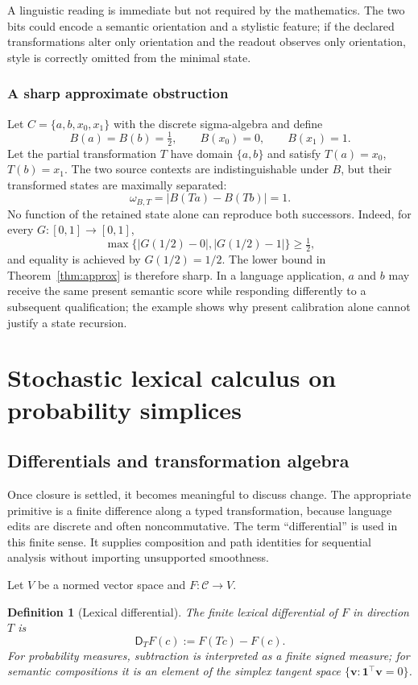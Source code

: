 \documentclass[11pt]{article}
\newtheorem{definition}{Definition}[section]
\newcommand{\Ctxt}{\mathcal C}
\newcommand{\Dlex}{\mathsf D}
\begin{document}
A linguistic reading is immediate but not required by the mathematics. The two bits could encode a semantic orientation and a stylistic feature; if the declared transformations alter only orientation and the readout observes only orientation, style is correctly omitted from the minimal state.

\subsubsection{A sharp approximate obstruction}
Let $C=\{a,b,x_0,x_1\}$ with the discrete sigma-algebra and define
\[
B(a)=B(b)=\tfrac12,\qquad B(x_0)=0,\qquad B(x_1)=1.
\]
Let the partial transformation $T$ have domain $\{a,b\}$ and satisfy $T(a)=x_0$, $T(b)=x_1$. The two source contexts are indistinguishable under $B$, but their transformed states are maximally separated:
\[
\omega_{B,T}=|B(Ta)-B(Tb)|=1.
\]
No function of the retained state alone can reproduce both successors. Indeed, for every $G:[0,1]\to[0,1]$,
\[
\max\{|G(1/2)-0|,|G(1/2)-1|\}\ge\tfrac12,
\]
and equality is achieved by $G(1/2)=1/2$. The lower bound in
Theorem~\ref{thm:approx} is therefore sharp. In a language application, $a$
and $b$ may receive the same present semantic score while responding
differently to a subsequent qualification; the example shows why present
calibration alone cannot justify a state recursion.

\section{Stochastic lexical calculus on probability simplices}

\subsection{Differentials and transformation algebra}

Once closure is settled, it becomes meaningful to discuss change.  The
appropriate primitive is a finite difference along a typed transformation,
because language edits are discrete and often noncommutative.  The term
``differential'' is used in this finite sense.  It supplies composition and
path identities for sequential analysis without importing unsupported
smoothness.

Let $V$ be a normed vector space and $F:\Ctxt\to V$.

\begin{definition}[Lexical differential]
The finite lexical differential of $F$ in direction $T$ is
\[
 \Dlex_TF(c):=F(Tc)-F(c).
\]
For probability measures, subtraction is interpreted as a finite signed measure; for semantic compositions it is an element of the simplex tangent space $\{\bm v:\bm1^\top\bm v=0\}$.
\end{definition}
\end{document}
